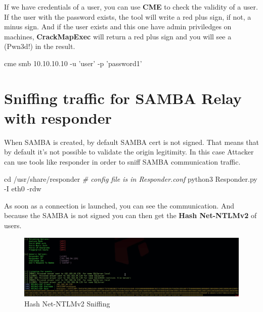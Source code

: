 \documentclass{assets/ipesethesis}
\newenvironment{Shaded}{\begin{snugshade}}{\end{snugshade}}
\newcommand{\BuiltInTok}[1]{#1}
\newcommand{\CommentTok}[1]{\textcolor[rgb]{0.56,0.35,0.01}{\textit{#1}}}
\newcommand{\ExtensionTok}[1]{#1}
\newcommand{\NormalTok}[1]{#1}
\newcommand{\StringTok}[1]{\textcolor[rgb]{0.31,0.60,0.02}{#1}}
\begin{document}
If we have credentials of a user, you can use \textbf{CME} to check the validity of a user. If the user with the password exists, the tool will
write a red plus sign, if not, a minus sign. And if the user exists and this one have admin priviledges on machines, \textbf{CrackMapExec} will
return a red plus sign and you will see a (Pwn3d!) in the result.

\begin{Shaded}
\begin{Highlighting}[]
\ExtensionTok{cme}\NormalTok{ smb 10.10.10.10 -u }\StringTok{'user'}\NormalTok{ -p }\StringTok{'password1'}
\end{Highlighting}
\end{Shaded}

\hypertarget{sniffing-traffic-for-samba-relay-with-responder}{%
\section*{Sniffing traffic for SAMBA Relay with responder}\label{sniffing-traffic-for-samba-relay-with-responder}}

When SAMBA is created, by default SAMBA cert is not signed. That means that by default it's not possible to validate the origin legitimity.
In this case Attacker can use tools like responder in order to sniff SAMBA communication traffic.

\begin{Shaded}
\begin{Highlighting}[]
\BuiltInTok{cd}\NormalTok{ /usr/share/responder}
\CommentTok{# config file is in Responder.conf}
\ExtensionTok{python3}\NormalTok{ Responder.py -I eth0 -rdw}
\end{Highlighting}
\end{Shaded}

As soon as a connection is launched, you can see the communication. And because the SAMBA is not signed you can then get the \textbf{Hash Net-NTLMv2} of users.

\begin{figure}
\includegraphics[width=0.9\linewidth]{images/ad-hashnetntlmv2} \caption{Hash Net-NTLMv2 Sniffing}\label{fig:unnamed-chunk-4}
\end{figure}
\end{document}
